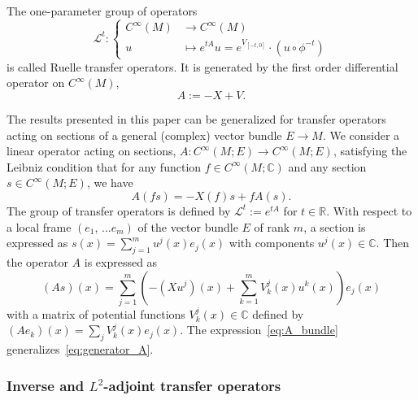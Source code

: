 \documentclass[AHL,Unicode,longabstracts,published]{cedram}
\newcommand{\clL}{\mathcal{L}}
\newcommand{\bbR}{\mathbb{R}}
\newcommand{\bbC}{\mathbb{C}}
\newcommand{\bbR}{\mathbb{R}}
\begin{document}
\begin{cBoxA}{}
\begin{defi}\label{def:transfer_operator}
The one-parameter group of operators
\begin{equation}\label{eq:def_Transfer_operator}
\clL^{t}:
\begin{cases}
C^{\infty}\left(M\right) & \rightarrow C^{\infty}\left(M\right)\\
u & \mapsto e^{tA}u=e^{V_{\left[-t,0\right]}}\cdot\left(u\circ\phi^{-t}\right)
\end{cases}
\end{equation}
is called Ruelle transfer operators. It is generated by the first order differential operator on $C^{\infty}(M)$,
\begin{equation}\label{eq:generator_A}
A:=-X+V.
\end{equation}
\end{defi}
\end{cBoxA}

\begin{rema}
The results presented in this paper can be generalized for transfer operators acting on sections of a general (complex) vector bundle $E\rightarrow M$. We consider a linear operator acting on sections, $A:C^{\infty}(M;E)\rightarrow C^{\infty}(M;E)$, satisfying the Leibniz condition that for any function $f\in C^{\infty}(M;\bbC)$ and any section $s\in C^{\infty}(M;E)$, we have
\[
A\left(fs\right)=-X\left(f\right)s+fA\left(s\right).
\]
The group of transfer operators is defined by $\clL^{t}:=e^{tA}$ for $t\in\bbR$. With respect to a local frame $(e_{1},\,\ldots e_{m})$ of the vector bundle $E$ of rank $m$, a section is expressed as $s(x)=\sum_{j=1}^{m}u^{j}(x)e_{j}(x)$ with components $u^{j}(x)\in\bbC$. Then the operator $A$ is expressed as
\begin{equation}\label{eq:A_bundle}
\left(As\right)\left(x\right)=\sum_{j=1}^{m}\left(-\left(Xu^{j}\right)\left(x\right)+\sum_{k=1}^{m}V_{k}^{j}\left(x\right)u^{k}\left(x\right)\right)e_{j}\left(x\right)
\end{equation}
with a matrix of potential functions $V_{k}^{j}(x)\in\bbC$ defined by $(Ae_{k})(x)=\sum_{j}V_{k}^{j}(x)e_{j}(x)$. The expression~\eqref{eq:A_bundle} generalizes~\eqref{eq:generator_A}.
\end{rema}


\subsubsection*{Inverse and \texorpdfstring{$L^{2}$}{L2}-adjoint transfer operators}
\end{document}
